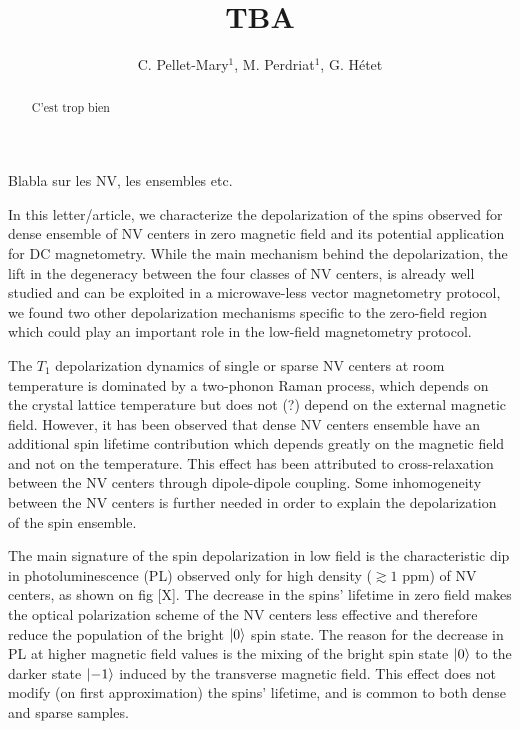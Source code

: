 \documentclass[preprintnumbers,amsmath,amssymb,superscriptaddress,twocolumn,showpacs]{revtex4-1}
\begin{document}
\title{TBA}

\author{C. Pellet-Mary$^1$, M. Perdriat$^1$, G. H\'etet} 


\begin{abstract}
C'est trop bien
\end{abstract}

\maketitle
Blabla sur les NV, les ensembles etc.

In this letter/article, we characterize the depolarization of the spins observed for dense ensemble of NV centers in zero magnetic field and its potential application for DC magnetometry. While the main mechanism behind the depolarization, the lift in the degeneracy between the four classes of NV centers, is already well studied and can be exploited in a microwave-less vector magnetometry protocol, we found two other depolarization mechanisms specific to the zero-field region which could play an important role in the low-field magnetometry protocol.

The $T_1$ depolarization dynamics of single or sparse NV centers at room temperature is dominated by a two-phonon Raman process, which depends on the crystal lattice temperature but does not (?) depend on the external magnetic field. However, it has been observed that dense NV centers ensemble have an additional spin lifetime contribution which depends greatly on the magnetic field and not on the temperature. This effect has been attributed to cross-relaxation between the NV centers through dipole-dipole coupling. Some inhomogeneity between the NV centers is further needed in order to explain the depolarization of the spin ensemble.

The main signature of the spin depolarization in low field is the characteristic dip in photoluminescence (PL) observed only for high density ($\gtrsim 1$ ppm) of NV centers, as shown on fig [X]. The decrease in the spins' lifetime in zero field makes the optical polarization scheme of the NV centers less effective and therefore reduce the population of the bright $\ket{0}$ spin state. The reason for the decrease in PL at higher magnetic field values is the mixing of the bright spin state $\ket{0}$ to the darker state $\ket{-1}$ induced by the transverse magnetic field. This effect does not modify (on first approximation) the spins' lifetime, and is common to both dense and sparse samples.
\end{document}
